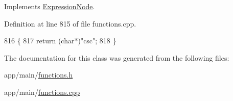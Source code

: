 Implements \hyperlink{classExpressionNode_a42a5e9562b0f645a19dcc83f698069b5}{Expression\+Node}.



Definition at line 815 of file functions.\+cpp.


\begin{DoxyCode}
816 \{
817     \textcolor{keywordflow}{return} (\textcolor{keywordtype}{char}*)\textcolor{stringliteral}{"csc"};
818 \}
\end{DoxyCode}


The documentation for this class was generated from the following files\+:\begin{DoxyCompactItemize}
\item 
app/main/\hyperlink{functions_8h}{functions.\+h}\item 
app/main/\hyperlink{functions_8cpp}{functions.\+cpp}\end{DoxyCompactItemize}

